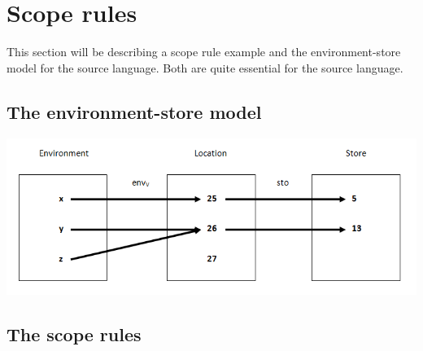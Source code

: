 \chapter{Scope rules}\label{chap:scope-rules}
This section will be describing a scope rule example and the environment-store model for the source language. Both are quite essential for the source language.

\section{The environment-store model}\label{sec:es-model}

\includegraphics{billeder/environment_store_model.png}

\section{The scope rules}\label{sec:scope-rules}
